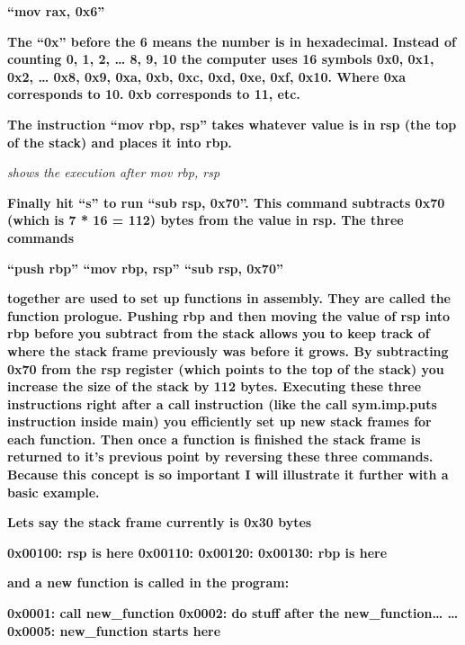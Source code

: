 \documentclass[letterpaper]{article}
\newcommand{\sitfig}[3]{
\begin{figure}[H]
\centering
\makebox[\textwidth][c]{
#2
}
\label{#1}
\end{figure}
}
\newcommand{\sitgfx}[4][scale=1.0]{
\sitfig{#3}{\texttt{[image: \#2]}}{#4}
}
\begin{document}
\textbf{{}``mov rax, 0x6''}

\textbf{The ``0x'' before the 6 means the number is in hexadecimal. Instead of counting 0, 1, 2, {\dots} 8, 9, 10 the
computer uses 16 symbols 0x0, 0x1, 0x2, {\dots} 0x8, 0x9, 0xa, 0xb, 0xc, 0xd, 0xe, 0xf, 0x10. Where 0xa corresponds to
10. 0xb corresponds to 11, etc.}

\textbf{The instruction ``mov rbp, rsp'' takes whatever value is in rsp (the top of the stack) and places it into rbp.}

  
\sitgfx[width=5.8335in,height=3.6457in]{FINALWORKINGDOCFORMERLYPRECURSOR-img088.png}{fig:unk}{TODO CAPTION}
 

\textit{shows the execution after mov rbp, rsp}

\textbf{Finally hit ``s'' to run ``sub rsp, 0x70''. This command subtracts 0x70 (which is 7 * 16 = 112) bytes from the
value in rsp. The three commands}

\textbf{{}``push rbp''\newline
{}``mov rbp, rsp''\newline
{}``sub rsp, 0x70''}

\textbf{together are used to set up functions in assembly. They are called the function prologue. Pushing rbp and then
moving the value of rsp into rbp before you subtract from the stack allows you to keep track of where the stack frame
previously was before it grows. By subtracting 0x70 from the rsp register (which points to the top of the stack) you
increase the size of the stack by 112 bytes. Executing these three instructions right after a call instruction (like
the call sym.imp.puts instruction inside main) you efficiently set up new stack frames for each function. Then once a
function is finished the stack frame is returned to it's previous point by reversing these three commands. Because this
concept is so important I will illustrate it further with a basic example.}

\textbf{Lets say the stack frame currently is 0x30 bytes}

\textbf{0x00100: rsp is here\newline
0x00110:\newline
0x00120:\newline
0x00130: rbp is here}

\textbf{and a new function is called in the program:}

\textbf{0x0001: call new\_function\newline
0x0002: do stuff after the new\_function{\dots}\newline
{\dots} 0x0005: new\_function starts here}
\end{document}
